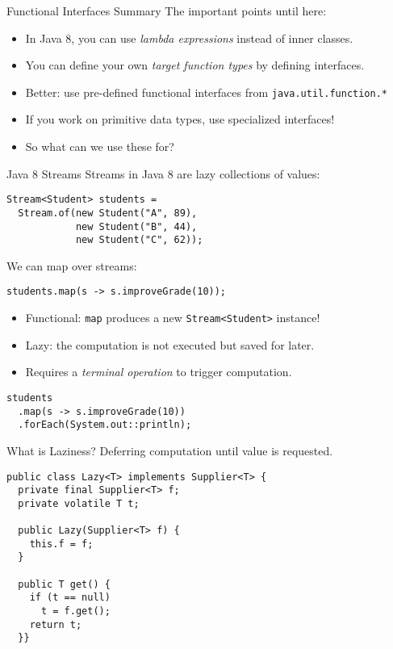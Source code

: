 \documentclass{beamer}
\begin{document}
\begin{frame}{Functional Interfaces Summary}
  The important points until here:

  \begin{itemize}
  \pause{} \item In Java 8, you can use \emph{lambda expressions} instead of inner classes.
  \pause{} \item You can define your own \emph{target function types} by defining interfaces.
  \pause{} \item Better: use pre-defined functional interfaces from \lstinline{java.util.function.*}
  \pause{} \item If you work on primitive data types, use specialized interfaces!
  \pause{} \item So what can we use these for?
  \end{itemize}
\end{frame}

\begin{frame}[fragile]{Java 8 Streams}
Streams in Java 8 are lazy collections of values:

\begin{lstlisting}
Stream<Student> students =
  Stream.of(new Student("A", 89),
            new Student("B", 44),
            new Student("C", 62));
\end{lstlisting}

\pause{} We can map over streams:

\begin{lstlisting}
students.map(s -> s.improveGrade(10));
\end{lstlisting}

\begin{itemize}
\pause{} \item Functional: \lstinline{map} produces a new \lstinline{Stream<Student>} instance!
\pause{} \item Lazy: the computation is not executed but saved for later.
\pause{} \item Requires a \emph{terminal operation} to trigger computation.
\end{itemize}

\pause{}

\begin{lstlisting}
students
  .map(s -> s.improveGrade(10))
  .forEach(System.out::println);
\end{lstlisting}
\end{frame}

\begin{frame}[fragile]{What is Laziness?}
Deferring computation until value is requested.

\begin{lstlisting}
public class Lazy<T> implements Supplier<T> {
  private final Supplier<T> f;
  private volatile T t;

  public Lazy(Supplier<T> f) {
    this.f = f;
  }

  public T get() {
    if (t == null)
      t = f.get();
    return t;
  }}
\end{lstlisting}
\end{frame}
\end{document}
